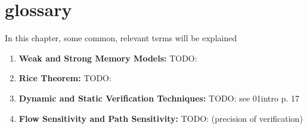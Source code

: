 \section{glossary}

In this chapter, some common, relevant terms will be explained

\begin{enumerate}
    \item \textbf{Weak and Strong Memory Models:} TODO:
    \item \textbf{Rice Theorem:} TODO:
    \item \textbf{Dynamic and Static Verification Techniques:} TODO: see 01intro  p. 17
    \item \textbf{Flow Sensitivity and Path Sensitivity:} TODO: (precision of verification)
\end{enumerate}